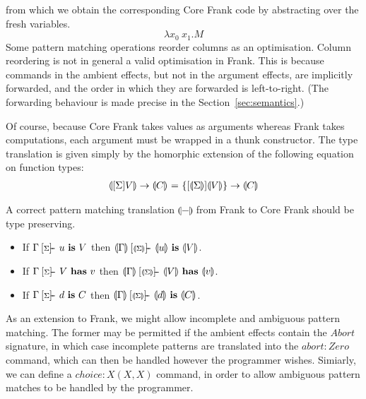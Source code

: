 \documentclass[preprint]{sigplanconf}
\makeatletter
\newcommand{\many}{\overline}
\newcommand{\pc}[1]{\llparenthesis{#1}\rrparenthesis}
\newcommand\ba{\begin{array}}
\newcommand\ea{\end{array}}
\newenvironment{equations}{\[\ba{@{}r@{~}c@{~}l@{}}}{\ea\]}
\newcommand{\judgeword}[1]{~\mathbf{#1}~}
\newcommand{\sigentails}[1]{\mathbin{[{\text{\scriptsize ${#1}$}}]\!\text{-\!-}}\,}
\newcommand{\makes}[4]  {#1 \sigentails{#2} {#3} \judgeword{is} {#4}}
\newcommand{\has}[4] {#1 \sigentails{#2} {#3} \judgeword{has} {#4}}
\newcommand{\can}[4]{#1 \sigentails{#2} {#3} \judgeword{is} {#4}}
\newcommand{\idoes}[3]{#1 \vdash {#2} \judgeword{has} {#3}}
\newcommand{\makesgs}{\makes{\Gamma}{\sigs}}
\newcommand{\hasgs}{\has{\Gamma}{\sigs}}
\newcommand{\cangs}{\can{\Gamma}{\sigs}}
\newcommand{\idoesg}{\idoes{\Gamma}}
\newcommand{\sigs}{\Sigma}
\newcommand{\effbox}[1]{[#1]}
\newcommand{\var}{\mathit}
\newcommand{\thunk}[1]{\{{#1}\}}
\makeatother
\begin{document}
%
from which we obtain the corresponding Core Frank code by abstracting
over the fresh variables.
%
\[
\lambda x_0~x_1.M
\]
Some pattern matching operations reorder columns as an
optimisation. Column reordering is not in general a valid optimisation
in Frank. This is because commands in the ambient effects, but not in
the argument effects, are implicitly forwarded, and the order in which
they are forwarded is left-to-right. (The forwarding behaviour is made
precise in the Section~\ref{sec:semantics}.)

Of course, because Core Frank takes values as arguments whereas Frank
takes computations, each argument must be wrapped in a thunk
constructor.
%
The type translation is given simply by the homorphic extension of the
following equation on function types:
\begin{equations}
\pc{\effbox{\sigs}V} \to \pc{C} &=& \thunk{\effbox{\pc{\sigs}}\pc{V}} \to \pc{C} \\
\end{equations}

A correct pattern matching translation $\pc{-}$ from Frank to Core
Frank should be type preserving.
\begin{itemize}
\item If $\makesgs{u}{V}$ then $\makes{\pc{\Gamma}}{\pc{\sigs}}{\pc{u}}{\pc{V}}$.
\item If $\hasgs{V}{v}$   then $\has{\pc{\Gamma}}{\pc{\sigs}}{\pc{V}}{\pc{v}}$.
\item If $\cangs{d}{C}$   then $\can{\pc{\Gamma}}{\pc{\sigs}}{\pc{d}}{\pc{C}}$.
\end{itemize}

As an extension to Frank, we might allow incomplete and ambiguous
pattern matching. The former may be permitted if the ambient effects
contain the $\var{Abort}$ signature, in which case incomplete patterns
are translated into the $\var{abort}:\var{Zero}$ command, which can
then be handled however the programmer wishes. Simiarly, we can define
a $\var{choice}:X(X, X)$ command, in order to allow ambiguous pattern
matches to be handled by the programmer.

\end{document}
